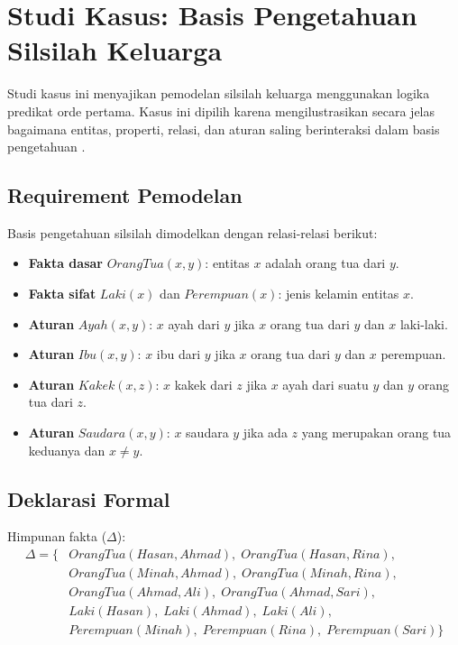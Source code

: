 \section{Studi Kasus: Basis Pengetahuan Silsilah Keluarga}

Studi kasus ini menyajikan pemodelan silsilah keluarga menggunakan logika predikat orde pertama. Kasus ini dipilih karena mengilustrasikan secara jelas bagaimana entitas, properti, relasi, dan aturan saling berinteraksi dalam basis pengetahuan \cite{rosen2019}.

\subsection{Requirement Pemodelan}

Basis pengetahuan silsilah dimodelkan dengan relasi-relasi berikut:

\begin{itemize}[leftmargin=*, nosep]
    \item \textbf{Fakta dasar} $OrangTua(x, y)$: entitas $x$ adalah orang tua dari $y$.
    \item \textbf{Fakta sifat} $Laki(x)$ dan $Perempuan(x)$: jenis kelamin entitas $x$.
    \item \textbf{Aturan} $Ayah(x, y)$: $x$ ayah dari $y$ jika $x$ orang tua dari $y$ dan $x$ laki-laki.
    \item \textbf{Aturan} $Ibu(x, y)$: $x$ ibu dari $y$ jika $x$ orang tua dari $y$ dan $x$ perempuan.
    \item \textbf{Aturan} $Kakek(x, z)$: $x$ kakek dari $z$ jika $x$ ayah dari suatu $y$ dan $y$ orang tua dari $z$.
    \item \textbf{Aturan} $Saudara(x, y)$: $x$ saudara $y$ jika ada $z$ yang merupakan orang tua keduanya dan $x \neq y$.
\end{itemize}

\subsection{Deklarasi Formal}

Himpunan fakta ($\Delta$):
\begin{align*}
\Delta = \{ & OrangTua(Hasan, Ahmad), \; OrangTua(Hasan, Rina), \\
            & OrangTua(Minah, Ahmad), \; OrangTua(Minah, Rina), \\
            & OrangTua(Ahmad, Ali), \; OrangTua(Ahmad, Sari), \\
            & Laki(Hasan), \; Laki(Ahmad), \; Laki(Ali), \\
            & Perempuan(Minah), \; Perempuan(Rina), \; Perempuan(Sari) \}
\end{align*}

